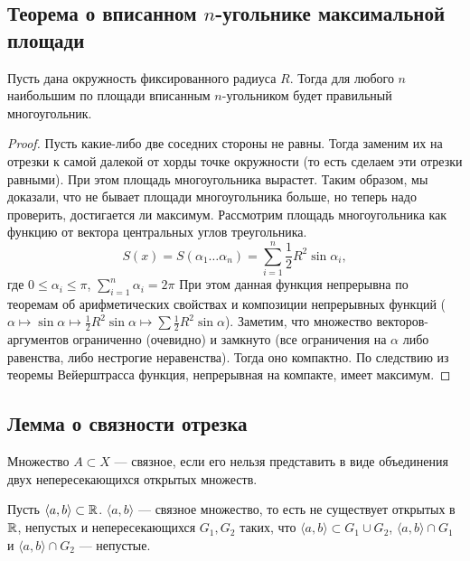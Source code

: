 \newpage
\subsection{Теорема о вписанном $n$-угольнике максимальной площади}
\begin{theorem*}
Пусть дана окружность фиксированного радиуса $R$. Тогда для любого $n$ наибольшим по площади вписанным $n$-угольником будет правильный многоугольник.
\end{theorem*}

\begin{proof}
Пусть какие-либо две соседних стороны не равны. Тогда заменим их на отрезки к самой далекой от хорды точке окружности (то есть сделаем эти отрезки равными). При этом площадь многоугольника вырастет. %
Таким образом, мы доказали, что не бывает площади многоугольника больше, но теперь надо проверить, достигается ли максимум. %
Рассмотрим площадь многоугольника как функцию от вектора центральных %
углов треугольника.
$$S(x) = S(\alpha_1 \dots \alpha_n) = \sum_{i = 1}^{n}\frac{1}{2} R^2 \sin \alpha_i,$$ где $0 \leqslant \alpha_i \leqslant \pi$, $\sum_{i = 1}^{n} \alpha_i = 2 \pi$
При этом данная функция непрерывна по теоремам об арифметических свойствах и композиции непрерывных функций ($\alpha \mapsto \sin \alpha \mapsto \frac{1}{2} R^2 \sin \alpha \mapsto \sum \frac{1}{2} R^2 \sin \alpha$). Заметим, что множество векторов-аргументов ограниченно (очевидно) и замкнуто (все ограничения на $\alpha$ либо равенства, либо нестрогие неравенства). Тогда оно компактно. По следствию из теоремы Вейерштрасса функция, непрерывная на компакте, имеет максимум.
\end{proof}
\newpage
\subsection{Лемма о связности отрезка}
\begin{definition}
Множество $A \subset X$ --- связное, если его нельзя представить в виде объединения двух непересекающихся открытых множеств. \\
\end{definition}
\begin{lemma}
Пусть $\langle a, b \rangle \subset \operatorname*{\mathbb{R}}$. $\langle a, b \rangle$ --- связное множество, то есть не существует открытых в $\operatorname*{\mathbb{R}}$, непустых и непересекающихся $G_1, G_2$ таких, что $\langle a, b \rangle \subset G_1 \cup G_2$, $\langle a, b\rangle \cap G_1$ и $\langle a, b\rangle \cap G_2$ --- непустые.
\end{lemma}

